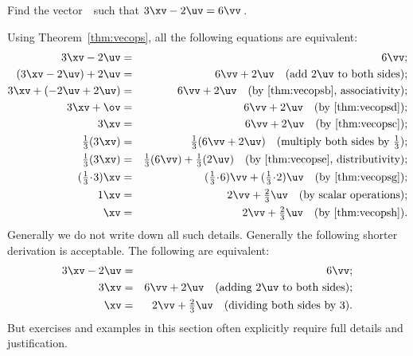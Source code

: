 \begin{example} \label{eg:}
Find the vector~\xv\ such that \(3\xv-2\uv=6\vv\)\,.
\begin{solution} 
Using Theorem~\ref{thm:vecops}, all the following equations are equivalent:
\begin{eqnarray*}
3\xv-2\uv&=&6\vv
;\\
(3\xv-2\uv)+2\uv&=&6\vv+2\uv
\quad(\text{add \(2\uv\) to both sides});\\
3\xv+(-2\uv+2\uv)&=&6\vv+2\uv
\quad(\text{by \ref{thm:vecopsb}, associativity});\\
3\xv+\ov&=&6\vv+2\uv
\quad(\text{by \ref{thm:vecopsd}});\\
3\xv&=&6\vv+2\uv
\quad(\text{by \ref{thm:vecopsc}});\\
\tfrac13(3\xv)&=&\tfrac13(6\vv+2\uv)
\quad(\text{multiply both sides by }\tfrac13);\\
\tfrac13(3\xv)&=&\tfrac13(6\vv)+\tfrac13(2\uv)
\quad(\text{by \ref{thm:vecopse}, distributivity});\\
(\tfrac13\cdot3)\xv&=&(\tfrac13\cdot6)\vv+(\tfrac13\cdot2)\uv
\quad(\text{by \ref{thm:vecopsg}});\\
1\xv&=&2\vv+\tfrac23\uv
\quad(\text{by scalar operations});\\
\xv&=&2\vv+\tfrac23\uv
\quad(\text{by \ref{thm:vecopsh}}).
\end{eqnarray*}
Generally we do not write down all such details.
Generally the following shorter derivation is acceptable.
The following are equivalent:
\begin{eqnarray*}
3\xv-2\uv&=&6\vv
;\\
3\xv&=&6\vv+2\uv
\quad(\text{adding \(2\uv\) to both sides});\\
\xv&=&2\vv+\tfrac23\uv
\quad(\text{dividing both sides by }3).
\end{eqnarray*}
But exercises and examples in this section often explicitly require full details and justification.
\end{solution}
\end{example}





